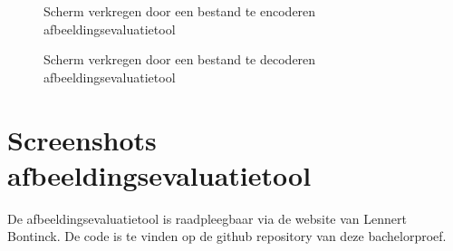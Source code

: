 \FloatBarrier
\begin{figure}[h!]
	\caption{Scherm verkregen door een bestand te encoderen \gls{afbeeldingsevaluatietool}}
	\label{fig:bijlages-screenshot-datacompressietool-encoded}
\end{figure}
\FloatBarrier

\FloatBarrier
\begin{figure}[h!]
	\caption{Scherm verkregen door een bestand te decoderen \gls{afbeeldingsevaluatietool}}
	\label{fig:bijlages-screenshot-datacompressietool-decoded}
\end{figure}
\FloatBarrier


\section{Screenshots afbeeldingsevaluatietool}
\label{sec:bijlages-screenshot-afbeeldingsevaluatietool}

De \gls{afbeeldingsevaluatietool} is raadpleegbaar via de website van Lennert Bontinck. De code is te vinden op de \gls{github} repository van deze bachelorproef.

